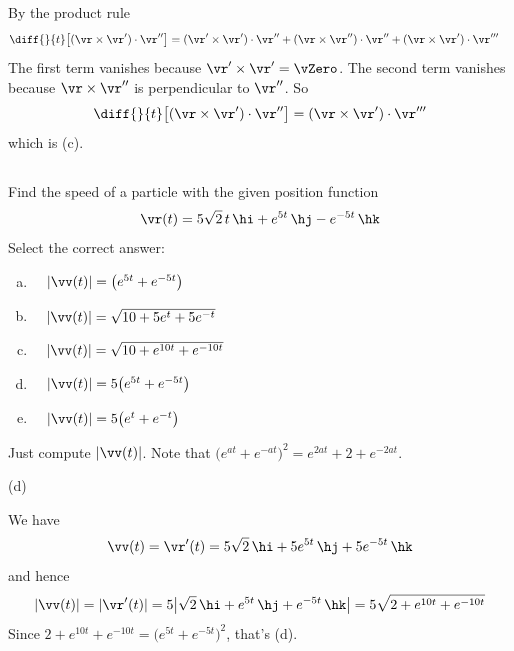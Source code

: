 \begin{solution}
By the product rule
\begin{align*}
\diff{\hfill}{t}\big[ (\vr \times \vr')\cdot\vr'' \big]
&= (\vr' \times \vr')\cdot\vr''
  +(\vr \times \vr'')\cdot\vr''
  +(\vr \times \vr')\cdot\vr'''
\end{align*}
The first term vanishes because $\vr'\times\vr'=\vZero$.
The second term vanishes because $\vr \times \vr''$ is perpendicular to
$\vr''$. So
\begin{equation*}
\diff{\hfill}{t}\big[ (\vr \times \vr')\cdot\vr'' \big]
= (\vr \times \vr')\cdot\vr'''
\end{equation*}
which is (c).
\end{solution}
\subsection*{\Procedural}

\begin{question}[M317 2005D] %
Find the speed of a particle with the given position function
\begin{equation*}
\vr(t) = 5 \sqrt{2}\,t\,\hi + e^{5t}\,\hj - e^{-5t}\,\hk
\end{equation*}
Select the correct answer:
\begin{enumerate}[(a)]
\item\ \ 
$|\vv(t)| = \big(e^{5t} + e^{-5t}\big)$
\item\ \ 
$|\vv(t)| = \sqrt{10 + 5e^{t} + 5e^{-t}}$
\item\ \ 
$|\vv(t)| = \sqrt{10 + e^{10t} + e^{-10t}}$
\item\ \ 
$|\vv(t)| = 5\big(e^{5t} + e^{-5t}\big)$
\item\ \ 
$|\vv(t)| = 5\big(e^t + e^{-t}\big)$
\end{enumerate}
\end{question}

\begin{hint} 
Just compute $|\vv(t)|$. Note that $\big(e^{at}+e^{-at}\big)^2 
=e^{2at} + 2 + e^{-2at}$.
\end{hint}

\begin{answer} 
(d)
\end{answer}

\begin{solution}
We have
\begin{equation*}
\vv(t) = \vr'(t) 
      = 5 \sqrt{2}\,\hi + 5e^{5t}\,\hj +5 e^{-5t}\,\hk
\end{equation*}
and hence
\begin{equation*}
|\vv(t)| = |\vr'(t)| 
         = 5 \big|\sqrt{2}\,\hi + e^{5t}\,\hj + e^{-5t}\,\hk\big|
         = 5\sqrt{2+ e^{10t}+ e^{-10t}}
\end{equation*}
Since $2+ e^{10t}+ e^{-10t} = \big(e^{5t}+e^{-5t}\big)^2$, that's (d).
\end{solution}


